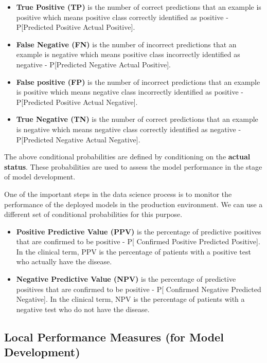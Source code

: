 \documentclass[
]{book}
\begin{document}
\begin{itemize}
\item
  \textbf{True Positive (TP)} is the number of correct predictions that an example is positive which means positive class correctly identified as positive - P{[}Predicted Positive \textbar{} Actual Positive{]}.
\item
  \textbf{False Negative (FN)} is the number of incorrect predictions that an example is negative which means positive class incorrectly identified as negative - P{[}Predicted Negative \textbar{} Actual Positive{]}.
\item
  \textbf{False positive (FP)} is the number of incorrect predictions that an example is positive which means negative class incorrectly identified as positive - P{[}Predicted Positive \textbar{} Actual Negative{]}.
\item
  \textbf{True Negative (TN)} is the number of correct predictions that an example is negative which means negative class correctly identified as negative - P{[}Predicted Negative \textbar{} Actual Negative{]}.
\end{itemize}

The above conditional probabilities are defined by conditioning on the \textbf{actual status}. These probabilities are used to assess the model performance in the stage of model development.

One of the important steps in the data science process is to monitor the performance of the deployed models in the production environment. We can use a different set of conditional probabilities for this purpose.

\begin{itemize}
\item
  \textbf{Positive Predictive Value (PPV)} is the percentage of predictive positives that are confirmed to be positive - P{[} Confirmed Positive \textbar{} Predicted Positive{]}. In the clinical term, PPV is the percentage of patients with a positive test who actually have the disease.
\item
  \textbf{Negative Predictive Value (NPV)} is the percentage of predictive positives that are confirmed to be positive - P{[} Confirmed Negative \textbar{} Predicted Negative{]}. In the clinical term, NPV is the percentage of patients with a negative test who do not have the disease.
\end{itemize}

\hypertarget{local-performance-measures-for-model-development}{%
\subsection{Local Performance Measures (for Model Development)}\label{local-performance-measures-for-model-development}}
\end{document}

